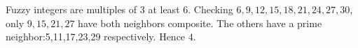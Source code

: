 Fuzzy integers are multiples of 3 at least 6. Checking $6,9,12,15,18,21,24,27,30$, only $9,15,21,27$ have both neighbors composite. The others have a prime neighbor:5,11,17,23,29 respectively. Hence $\boxed4$.
